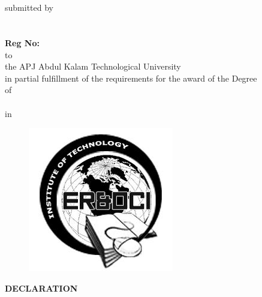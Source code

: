 \documentclass[12pt,a4paper]{report}
\begin{document}
\thispagestyle{empty}
\begin{center}
{\Large{\textbf{\projectnameb{}}}}
\vspace{5mm}
\\ \MakeUppercase{\reportTitle{}}
\vspace{5mm}
\\submitted by
\\\stud{}
\vspace{5mm}
\\ \dept{} 
\\{\textbf{Reg No:\roll{}}}
\vspace{5mm}
\\to
\\the APJ Abdul Kalam Technological University
\\in partial fulfillment of the requirements for the award of the Degree
\\of
\\ \degree{}
\\in
\\ \stream{}
\end{center}

\begin{figure}[ht]
\centering
\includegraphics[scale=0.5]{logo}
\end{figure}

\begin{center}
{\dept{}
\vspace{5mm}
\insti{}}
\end{center}

\newpage
\thispagestyle{empty}

\begin{center}
\textbf{DECLARATION}
\end{center}
\end{document}
